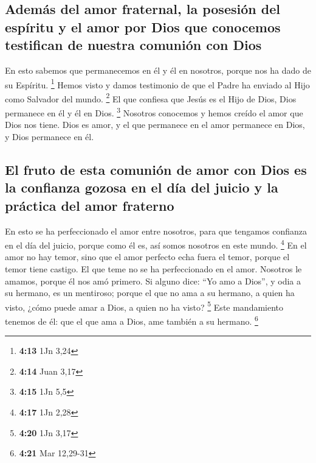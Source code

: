 \hypertarget{ademuxe1s-del-amor-fraternal-la-posesiuxf3n-del-espuxedritu-y-el-amor-por-dios-que-conocemos-testifican-de-nuestra-comuniuxf3n-con-dios}{%
\subsection{Además del amor fraternal, la posesión del espíritu y el
amor por Dios que conocemos testifican de nuestra comunión con
Dios}\label{ademuxe1s-del-amor-fraternal-la-posesiuxf3n-del-espuxedritu-y-el-amor-por-dios-que-conocemos-testifican-de-nuestra-comuniuxf3n-con-dios}}

 En esto sabemos que permanecemos en él y él en nosotros,
porque nos ha dado de su Espíritu. \footnote{\textbf{4:13} 1Jn 3,24}
 Hemos visto y damos testimonio de que el Padre ha
enviado al Hijo como Salvador del mundo. \footnote{\textbf{4:14} Juan
  3,17}  El que confiesa que Jesús es el Hijo de Dios,
Dios permanece en él y él en Dios. \footnote{\textbf{4:15} 1Jn 5,5}
 Nosotros conocemos y hemos creído el amor que Dios nos
tiene. Dios es amor, y el que permanece en el amor permanece en Dios, y
Dios permanece en él.

\hypertarget{el-fruto-de-esta-comuniuxf3n-de-amor-con-dios-es-la-confianza-gozosa-en-el-duxeda-del-juicio-y-la-pruxe1ctica-del-amor-fraterno}{%
\subsection{El fruto de esta comunión de amor con Dios es la confianza
gozosa en el día del juicio y la práctica del amor
fraterno}\label{el-fruto-de-esta-comuniuxf3n-de-amor-con-dios-es-la-confianza-gozosa-en-el-duxeda-del-juicio-y-la-pruxe1ctica-del-amor-fraterno}}

 En esto se ha perfeccionado el amor entre nosotros, para
que tengamos confianza en el día del juicio, porque como él es, así
somos nosotros en este mundo. \footnote{\textbf{4:17} 1Jn 2,28}
 En el amor no hay temor, sino que el amor perfecto echa
fuera el temor, porque el temor tiene castigo. El que teme no se ha
perfeccionado en el amor.  Nosotros le amamos, porque él
nos amó primero.  Si alguno dice: ``Yo amo a Dios'', y
odia a su hermano, es un mentiroso; porque el que no ama a su hermano, a
quien ha visto, ¿cómo puede amar a Dios, a quien no ha visto?
\footnote{\textbf{4:20} 1Jn 3,17}  Este mandamiento
tenemos de él: que el que ama a Dios, ame también a su hermano.
\footnote{\textbf{4:21} Mar 12,29-31}

